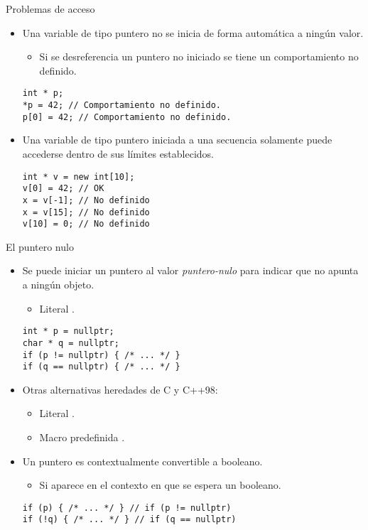 \begin{frame}[fragile]{Problemas de acceso}
\begin{itemize}
  \item Una variable de tipo puntero no se inicia de forma automática a ningún valor.
    \begin{itemize}
      \item Si se desreferencia un puntero no iniciado se tiene un comportamiento no definido.
    \end{itemize}
\begin{lstlisting}
int * p;
*p = 42; // Comportamiento no definido.
p[0] = 42; // Comportamiento no definido.
\end{lstlisting}
  \item Una variable de tipo puntero iniciada a una secuencia solamente puede accederse dentro
        de sus límites establecidos.
\begin{lstlisting}
int * v = new int[10];
v[0] = 42; // OK
x = v[-1]; // No definido
x = v[15]; // No definido
v[10] = 0; // No definido
\end{lstlisting}
\end{itemize}
\end{frame}

\begin{frame}[fragile]{El puntero nulo}
\begin{itemize}
  \item Se puede iniciar un puntero al valor \emph{puntero-nulo} para indicar que no apunta a ningún objeto.
    \begin{itemize}
      \item Literal .
    \end{itemize}
\begin{lstlisting}
int * p = nullptr;
char * q = nullptr;
if (p != nullptr) { /* ... */ }
if (q == nullptr) { /* ... */ }
\end{lstlisting}
  \item Otras alternativas heredades de C y C++98:
    \begin{itemize}
      \item Literal .
      \item Macro predefinida .
    \end{itemize}
  \item Un puntero es contextualmente convertible a booleano.
    \begin{itemize}
      \item Si aparece en el contexto en que se espera un booleano.
    \end{itemize}
\begin{lstlisting}
if (p) { /* ... */ } // if (p != nullptr) 
if (!q) { /* ... */ } // if (q == nullptr)
\end{lstlisting}
\end{itemize}
\end{frame}

